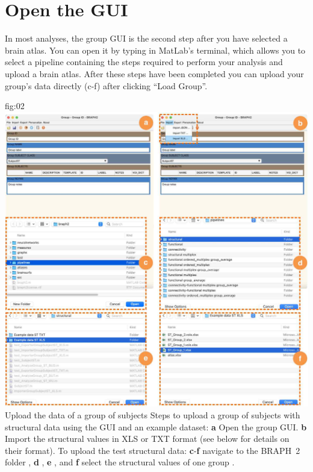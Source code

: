 \documentclass[justified]{tufte-handout}
\begin{document}
\section{Open the GUI}

In most analyses, the group GUI is the second step after you have selected a brain atlas. You can open it by typing  in MatLab's terminal, which allows you to select a pipeline containing the steps required to perform your analysis and upload a brain atlas. After these steps have been completed you can upload your group's data directly (c-f) after clicking ``Load Group''. 

	{fig:02}
	{
	\includegraphics{fig02.jpg}
	}
	{Upload the data of a group of subjects}
	{
	Steps to upload a group of subjects with structural data using the GUI and an example dataset: 
	{\bf a} Open the group GUI.
	{\bf b} Import the structural values in XLS or TXT format (see below for details on their format).
	To upload the test structural data:
	{\bf c}-{\bf f} navigate to the BRAPH~2 folder , {\bf d} ,  {\bf e} , and {\bf f} select the structural values of one group .
	}

\end{document}
